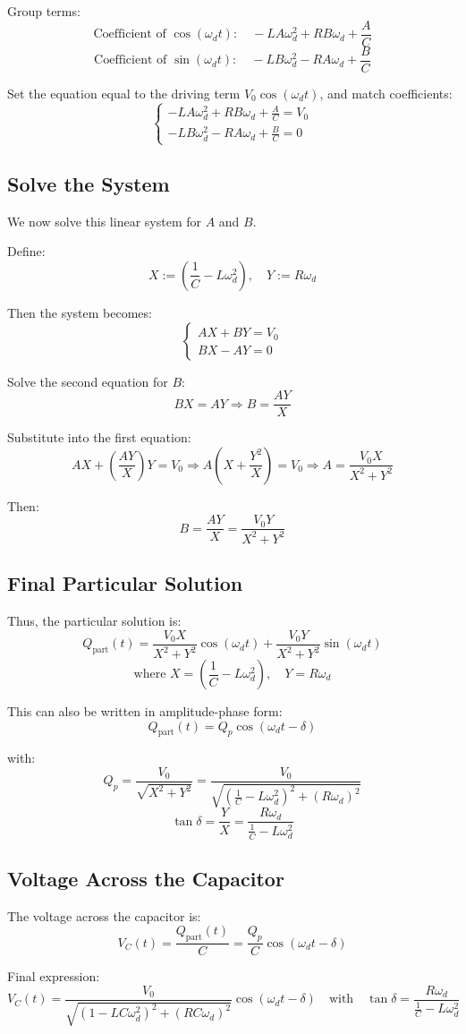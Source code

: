 \documentclass{article}
\begin{document}
Group terms:
\[
\text{Coefficient of } \cos(\omega_d t):\quad -L A \omega_d^2 + R B \omega_d + \frac{A}{C}
\]
\[
\text{Coefficient of } \sin(\omega_d t):\quad -L B \omega_d^2 - R A \omega_d + \frac{B}{C}
\]

Set the equation equal to the driving term \( V_0 \cos(\omega_d t) \), and match coefficients:
\[
\begin{cases}
- L A \omega_d^2 + R B \omega_d + \frac{A}{C} = V_0 \\
- L B \omega_d^2 - R A \omega_d + \frac{B}{C} = 0
\end{cases}
\]

\subsection*{Solve the System}

We now solve this linear system for \( A \) and \( B \).

Define:
\[
X := \left( \frac{1}{C} - L \omega_d^2 \right), \quad Y := R \omega_d
\]

Then the system becomes:
\[
\begin{cases}
A X + B Y = V_0 \\
B X - A Y = 0
\end{cases}
\]

Solve the second equation for \( B \):
\[
B X = A Y \Rightarrow B = \frac{A Y}{X}
\]

Substitute into the first equation:
\[
A X + \left( \frac{A Y}{X} \right) Y = V_0
\Rightarrow A \left( X + \frac{Y^2}{X} \right) = V_0
\Rightarrow A = \frac{V_0 X}{X^2 + Y^2}
\]

Then:
\[
B = \frac{A Y}{X} = \frac{V_0 Y}{X^2 + Y^2}
\]

\subsection*{Final Particular Solution}

Thus, the particular solution is:
\[
Q_{\text{part}}(t) = \frac{V_0 X}{X^2 + Y^2} \cos(\omega_d t) + \frac{V_0 Y}{X^2 + Y^2} \sin(\omega_d t)
\]
\[
\text{where } X = \left( \frac{1}{C} - L \omega_d^2 \right), \quad Y = R \omega_d
\]

This can also be written in amplitude-phase form:
\[
Q_{\text{part}}(t) = Q_p \cos(\omega_d t - \delta)
\]

with:
\[
Q_p = \frac{V_0}{\sqrt{X^2 + Y^2}} = \frac{V_0}{\sqrt{\left( \frac{1}{C} - L \omega_d^2 \right)^2 + (R \omega_d)^2}}
\]
\[
\tan \delta = \frac{Y}{X} = \frac{R \omega_d}{\frac{1}{C} - L \omega_d^2}
\]

\subsection*{Voltage Across the Capacitor}

The voltage across the capacitor is:
\[
V_C(t) = \frac{Q_{\text{part}}(t)}{C} = \frac{Q_p}{C} \cos(\omega_d t - \delta)
\]

Final expression:
\[
\boxed{
V_C(t) = \frac{V_0}{\sqrt{(1 - L C \omega_d^2)^2 + (R C \omega_d)^2}} \cos(\omega_d t - \delta)
}
\quad \text{with} \quad
\tan \delta = \frac{R \omega_d}{\frac{1}{C} - L \omega_d^2}
\]
\end{document}
